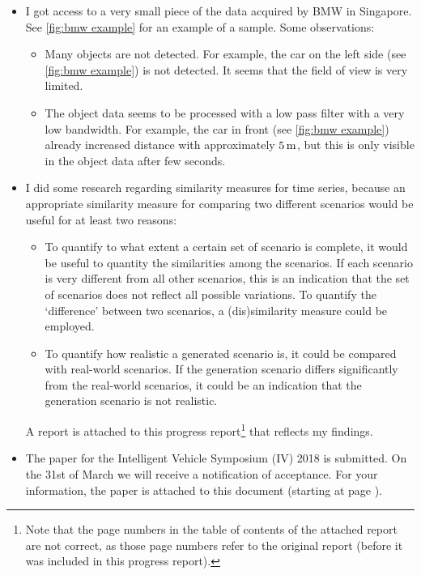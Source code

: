 \documentclass[10pt,final,a4paper,oneside,onecolumn]{article}
\begin{document}
\begin{itemize}
	\item I got access to a very small piece of the data acquired by BMW in Singapore. See \cref{fig:bmw example} for an example of a sample. Some observations:
	\begin{itemize}
		\item Many objects are not detected. For example, the car on the left side (see \cref{fig:bmw example}) is not detected. It seems that the field of view is very limited.
		\item The object data seems to be processed with a low pass filter with a very low bandwidth. For example, the car in front (see \cref{fig:bmw example}) already increased distance with approximately $\unit[5]{m}$, but this is only visible in the object data after few seconds.
	\end{itemize}
	\item I did some research regarding similarity measures for time series, because an appropriate similarity measure for comparing two different scenarios would be useful for at least two reasons:
	\begin{itemize}
		\item To quantify to what extent a certain set of scenario is complete, it would be useful to quantity the similarities among the scenarios. If each scenario is very different from all other scenarios, this is an indication that the set of scenarios does not reflect all possible variations. To quantify the `difference' between two scenarios, a (dis)similarity measure could be employed.
		\item To quantify how realistic a generated scenario is, it could be compared with real-world scenarios. If the generation scenario differs significantly from the real-world scenarios, it could be an indication that the generation scenario is not realistic.
	\end{itemize}
	A report is attached to this progress report\footnote{Note that the page numbers in the table of contents of the attached report are not correct, as those page numbers refer to the original report (before it was included in this progress report).} that reflects my findings.
	\item The paper for the Intelligent Vehicle Symposium (IV) 2018 is submitted. On the 31st of March we will receive a notification of acceptance. For your information, the paper is attached to this document (starting at page \pageref{ivpaper}).
\end{itemize}
\end{document}
